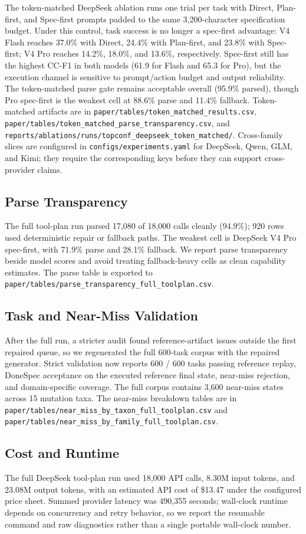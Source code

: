 The token-matched DeepSeek ablation runs one trial per task with Direct, Plan-first, and Spec-first prompts padded to the same 3,200-character specification budget. Under this control, task success is no longer a spec-first advantage: V4 Flash reaches 37.0\% with Direct, 24.4\% with Plan-first, and 23.8\% with Spec-first; V4 Pro reaches 14.2\%, 18.0\%, and 13.6\%, respectively. Spec-first still has the highest CC-F1 in both models (61.9 for Flash and 65.3 for Pro), but the execution channel is sensitive to prompt/action budget and output reliability. The token-matched parse gate remains acceptable overall (95.9\% parsed), though Pro spec-first is the weakest cell at 88.6\% parse and 11.4\% fallback. Token-matched artifacts are in \texttt{paper/tables/token\_matched\_results.csv}, \texttt{paper/tables/token\_matched\_parse\_transparency.csv}, and \texttt{reports/ablations/runs/topconf\_deepseek\_token\_matched/}. Cross-family slices are configured in \texttt{configs/experiments.yaml} for DeepSeek, Qwen, GLM, and Kimi; they require the corresponding keys before they can support cross-provider claims.

\subsection{Parse Transparency}

The full tool-plan run parsed 17,080 of 18,000 calls cleanly (94.9\%); 920 rows used deterministic repair or fallback paths. The weakest cell is DeepSeek V4 Pro spec-first, with 71.9\% parse and 28.1\% fallback. We report parse transparency beside model scores and avoid treating fallback-heavy cells as clean capability estimates. The parse table is exported to \texttt{paper/tables/parse\_transparency\_full\_toolplan.csv}.

\subsection{Task and Near-Miss Validation}

After the full run, a stricter audit found reference-artifact issues outside the first repaired queue, so we regenerated the full 600-task corpus with the repaired generator. Strict validation now reports 600 / 600 tasks passing reference replay, DoneSpec acceptance on the executed reference final state, near-miss rejection, and domain-specific coverage. The full corpus contains 3,600 near-miss states across 15 mutation taxa. The near-miss breakdown tables are in \texttt{paper/tables/near\_miss\_by\_taxon\_full\_toolplan.csv} and \texttt{paper/tables/near\_miss\_by\_family\_full\_toolplan.csv}.

\subsection{Cost and Runtime}

The full DeepSeek tool-plan run used 18,000 API calls, 8.30M input tokens, and 23.08M output tokens, with an estimated API cost of \$13.47 under the configured price sheet. Summed provider latency was 490,355 seconds; wall-clock runtime depends on concurrency and retry behavior, so we report the resumable command and raw diagnostics rather than a single portable wall-clock number.
